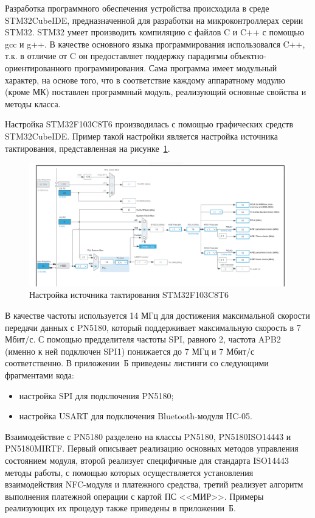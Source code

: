 Разработка программного обеспечения устройства происходила в среде STM32CubeIDE, предназначенной для разработки на микроконтроллерах серии STM32.
STM32 умеет производить компиляцию с файлов C и C++ с помощью gcc и g++.
В качестве основного языка программирования использовался C++, т.к. в отличие от C он предоставляет поддержку парадигмы объектно-ориентированного программирования.
Сама программа имеет модульный характер, на основе того, что в соответствие каждому аппаратному модулю (кроме МК) поставлен программный модуль, реализующий основные свойства и методы класса.

Настройка STM32F103C8T6 производилась с помощью графических средств STM32CubeIDE.
Пример такой настройки является настройка источника тактирования, представленная на рисунке~\ref{fig:stm_cube}.

\begin{figure}[h]
    \centering
    \includegraphics[width=1\textwidth]{images/design/stm_cube}
    \caption{\centering Настройка источника тактирования STM32F103C8T6}
    \label{fig:stm_cube}
\end{figure}

В качестве частоты используется 14 МГц для достижения максимальной скорости передачи данных с PN5180, который поддерживает максимальную скорость в 7 Мбит/с.
С помощью предделителя частоты SPI, равного 2, частота APB2 (именно к ней подключен SPI1) понижается до 7 МГц и 7 Мбит/с соответственно.
В приложении~Б приведены листинги со следующими фрагментами кода:
\begin{itemize}
    \item настройка SPI для подключения PN5180;
    \item настройка USART для подключения Bluetooth-модуля HC-05.
\end{itemize}

Взаимодействие с PN5180 разделено на классы PN5180, PN5180ISO14443 и PN5180MIRTF.
Первый описывает реализацию основных методов управления состоянием модуля, второй реализует специфичные для стандарта ISO14443 методы работы, с помощью которых осуществляется установления взаимодействия NFC-модуля и платежного средства, третий реализует алгоритм выполнения платежной операции с картой ПС <<МИР>>.
Примеры реализующих их процедур также приведены в приложении~Б.


